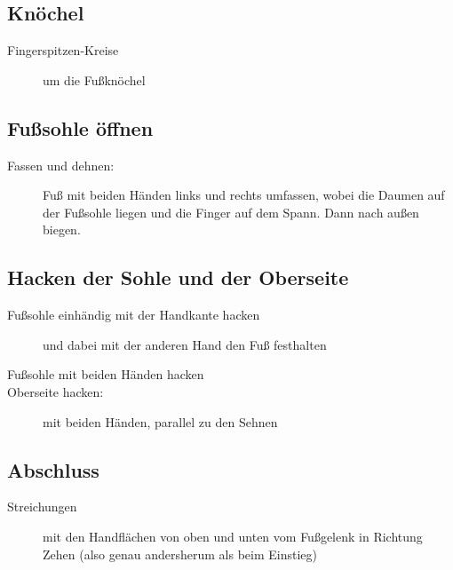 \subsection{Knöchel}
\begin{description}
	\item[Fingerspitzen-Kreise] um die Fußknöchel
\end{description}

\subsection{Fußsohle öffnen}
\begin{description}
	\item[Fassen und dehnen:] Fuß mit beiden Händen links und rechts umfassen, wobei die Daumen auf der Fußsohle liegen und die Finger auf dem Spann. Dann nach außen biegen.
\end{description}


\subsection{Hacken der Sohle und der Oberseite}
\begin{description}
	\item[Fußsohle einhändig mit der Handkante hacken] und dabei mit der anderen Hand den Fuß festhalten
	\item[Fußsohle mit beiden Händen hacken]
	\item[Oberseite hacken:] mit beiden Händen, parallel zu den Sehnen
\end{description}

\subsection{Abschluss}
\begin{description}
	\item[Streichungen] mit den Handflächen von oben und unten vom Fußgelenk in Richtung Zehen (also genau andersherum als beim Einstieg)
\end{description}
